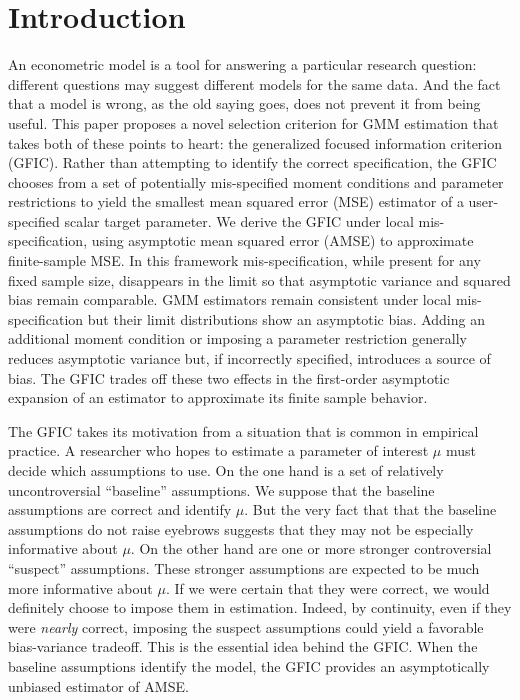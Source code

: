 \section{Introduction}

An econometric model is a tool for answering a particular research question: different questions may suggest different models for the same data. 
And the fact that a model is wrong, as the old saying goes, does not prevent it from being useful. 
This paper proposes a novel selection criterion for GMM estimation that takes both of these points to heart: the generalized focused information criterion (GFIC). 
Rather than attempting to identify the correct specification, the GFIC chooses from a set of potentially mis-specified moment conditions and parameter restrictions to yield the smallest mean squared error (MSE) estimator of a user-specified scalar target parameter. 
We derive the GFIC under local mis-specification, using asymptotic mean squared error (AMSE) to approximate finite-sample MSE. 
In this framework mis-specification, while present for any fixed sample size, disappears in the limit so that asymptotic variance and squared bias remain comparable. 
GMM estimators remain consistent under local mis-specification but their limit distributions show an asymptotic bias. 
Adding an additional moment condition or imposing a parameter restriction generally reduces asymptotic variance but, if incorrectly specified, introduces a source of bias.
The GFIC trades off these two effects in the first-order asymptotic expansion of an estimator to approximate its finite sample behavior.

The GFIC takes its motivation from a situation that is common in empirical practice.
A researcher who hopes to estimate a parameter of interest $\mu$ must decide which assumptions to use.
On the one hand is a set of relatively uncontroversial ``baseline'' assumptions.
We suppose that the baseline assumptions are correct and identify $\mu$.
But the very fact that that the baseline assumptions do not raise eyebrows suggests that they may not be especially informative about $\mu$. 
On the other hand are one or more stronger controversial ``suspect'' assumptions.
These stronger assumptions are expected to be much more informative about $\mu$.
If we were certain that they were correct, we would definitely choose to impose them in estimation.
Indeed, by continuity, even if they were \emph{nearly} correct, imposing the suspect assumptions could yield a favorable bias-variance tradeoff.
This is the essential idea behind the GFIC.
When the baseline assumptions identify the model, the GFIC provides an asymptotically unbiased estimator of AMSE.

